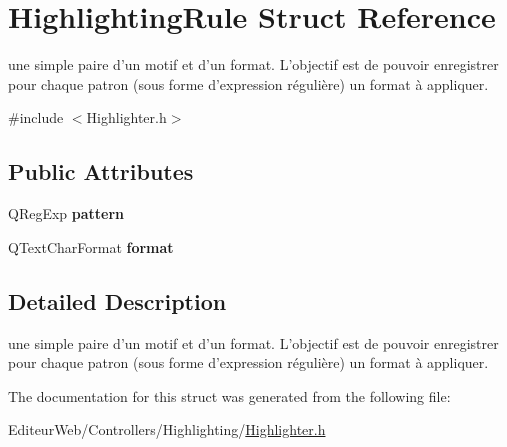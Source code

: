 \hypertarget{struct_highlighting_rule}{
\section{HighlightingRule Struct Reference}
\label{struct_highlighting_rule}
}


une simple paire d'un motif et d'un format. L'objectif est de pouvoir enregistrer pour chaque patron (sous forme d'expression régulière) un format à appliquer.  




{\ttfamily \#include $<$Highlighter.h$>$}

\subsection*{Public Attributes}
\begin{DoxyCompactItemize}
\item 
\hypertarget{struct_highlighting_rule_a4d0704ac60f720e308c7f6cdfebb5119}{
QRegExp {\bfseries pattern}}
\label{struct_highlighting_rule_a4d0704ac60f720e308c7f6cdfebb5119}

\item 
\hypertarget{struct_highlighting_rule_a8706a5cc13203e6c8fd93aecacf30923}{
QTextCharFormat {\bfseries format}}
\label{struct_highlighting_rule_a8706a5cc13203e6c8fd93aecacf30923}

\end{DoxyCompactItemize}


\subsection{Detailed Description}
une simple paire d'un motif et d'un format. L'objectif est de pouvoir enregistrer pour chaque patron (sous forme d'expression régulière) un format à appliquer. 

The documentation for this struct was generated from the following file:\begin{DoxyCompactItemize}
\item 
EditeurWeb/Controllers/Highlighting/\hyperlink{_highlighter_8h}{Highlighter.h}\end{DoxyCompactItemize}
